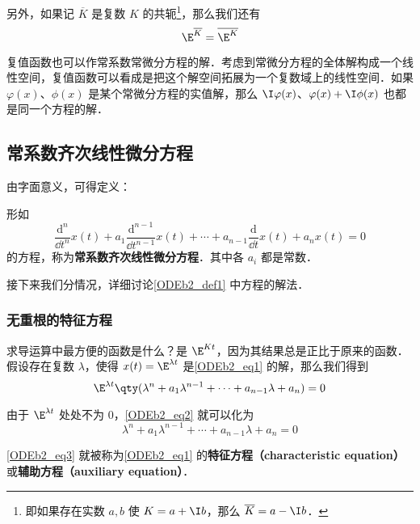 另外，如果记 $\overline{K}$ 是复数 $K$ 的共轭\footnote{即如果存在实数 $a, b$ 使 $K=a+\I b$，那么 $\overline{K}=a-\I b$．}，那么我们还有
\begin{equation}
\E^{\overline{K}}=\overline{\E^K}
\end{equation}

复值函数也可以作常系数常微分方程的解．考虑到常微分方程的全体解构成一个线性空间，复值函数可以看成是把这个解空间拓展为一个复数域上的线性空间．如果 $\varphi(x)$、$\phi(x)$ 是某个常微分方程的实值解，那么 $\I\varphi(x)$、$\varphi(x)+\I \phi(x)$ 也都是同一个方程的解．


\subsection{常系数齐次线性微分方程}



由字面意义，可得定义：
\begin{definition}{}\label{ODEb2_def1}
形如
\begin{equation}\label{ODEb2_eq1}
\frac{\mathrm{d}^n}{\dd t^n}x(t)+a_1\frac{\mathrm{d}^{n-1}}{\dd t^{n-1}}x(t)+\cdots+a_{n-1}\frac{\mathrm{d}}{\dd t}x(t)+a_nx(t)=0
\end{equation}
的方程，称为\textbf{常系数齐次线性微分方程}．其中各 $a_i$ 都是常数．
\end{definition}

接下来我们分情况，详细讨论\autoref{ODEb2_def1} 中方程的解法．

\subsubsection{无重根的特征方程}


求导运算中最方便的函数是什么？是 $\E^{Kt}$，因为其结果总是正比于原来的函数．假设存在复数 $\lambda$，使得 $x(t)=\E^{\lambda t}$ 是\autoref{ODEb2_eq1} 的解，那么我们得到
\begin{equation}\label{ODEb2_eq2}
\E^{\lambda t}\qty(\lambda^n+a_1\lambda^{n-1}+\cdots+a_{n-1}\lambda+a_n)=0
\end{equation}

由于 $\E^{\lambda t}$ 处处不为 $0$，\autoref{ODEb2_eq2} 就可以化为
\begin{equation}\label{ODEb2_eq3}
\lambda^n+a_1\lambda^{n-1}+\cdots+a_{n-1}\lambda+a_n=0
\end{equation}

\autoref{ODEb2_eq3} 就被称为\autoref{ODEb2_eq1} 的\textbf{特征方程（characteristic equation）}或\textbf{辅助方程（auxiliary equation）}．

